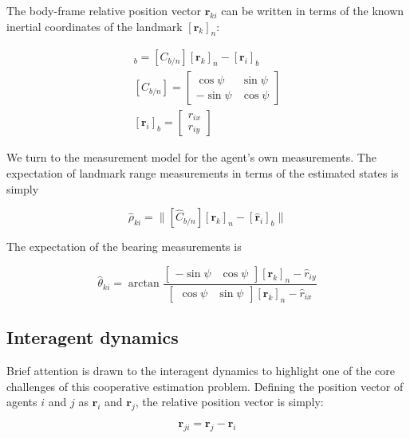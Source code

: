 \documentclass{aiaa-tc}
\newcommand{\br}[2]{[#1]_{#2}} %
\newcommand{\B}[1]{\textbf{#1}} %
\begin{document}
The body-frame relative position vector $\B{r}_{ki}$ can be written in terms of the known inertial coordinates of the landmark $\br{\B{r}_k}{n}$:

\begin{align}
\br{\B{r}_{ki}}{b} = [C_{b/n}]\br{\B{r}_{k}}{n}-\br{\B{r}_i}{b} \\
[C_{b/n}] = \begin{bmatrix}
\cos{\psi} & \sin{\psi} \\
-\sin{\psi} & \cos{\psi}
\end{bmatrix} \\
\br{\B{r}_i}{b} = \begin{bmatrix}
r_{ix}\\
r_{iy}
\end{bmatrix}
\end{align}

We turn to the measurement model for the agent's own measurements. The expectation of landmark range measurements in terms of the estimated states is simply

\begin{equation}
\hat{\rho}_{ki} = \| [\hat{C}_{b/n}]\br{\B{r}_{k}}{n}-\br{\hat{\B{r}}_i}{b} \|
\label{eq:rhoki}
\end{equation}

The expectation of the bearing measurements is

\begin{equation}
\hat{\theta}_{ki} = \arctan{\frac{ \begin{bmatrix}
-\sin{\psi} & \cos{\psi}
\end{bmatrix}\br{\B{r}_{k}}{n} - \hat{r}_{iy} }{ \begin{bmatrix}
\cos{\psi} & \sin{\psi}
\end{bmatrix}\br{\B{r}_{k}}{n} - \hat{r}_{ix} }}
\label{eq:thetaki}
\end{equation}

\subsection{Interagent dynamics}

Brief attention is drawn to the interagent dynamics to highlight one of the core challenges of this cooperative estimation problem. Defining the position vector of agents $i$ and $j$ as $\B{r}_i$ and $\B{r}_j$, the relative position vector is simply:

\begin{equation}
\B{r}_{ji} = \B{r}_j - \B{r}_i
\end{equation}
\end{document}

